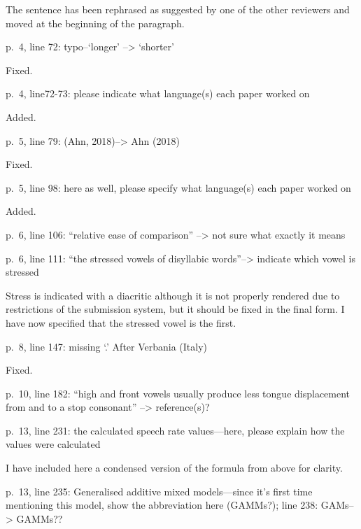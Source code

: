 \documentclass[]{article}
\begin{document}
\color{plum}

The sentence has been rephrased as suggested by one of the other
reviewers and moved at the beginning of the paragraph. \color{black}

p.~4, line 72: typo--`longer' --\textgreater{} `shorter'

\color{plum}

Fixed. \color{black}

p.~4, line72-73: please indicate what language(s) each paper worked on

\color{plum}

Added. \color{black}

p.~5, line 79: (Ahn, 2018)--\textgreater{} Ahn (2018)

\color{plum}

Fixed. \color{black}

p.~5, line 98: here as well, please specify what language(s) each paper
worked on

\color{plum}

Added. \color{black}

p.~6, line 106: ``relative ease of comparison'' --\textgreater{} not
sure what exactly it means

p.~6, line 111: ``the stressed vowels of disyllabic
words''--\textgreater{} indicate which vowel is stressed

\color{plum}

Stress is indicated with a diacritic although it is not properly
rendered due to restrictions of the submission system, but it should be
fixed in the final form. I have now specified that the stressed vowel is
the first. \color{black}

p.~8, line 147: missing `.' After Verbania (Italy)

\color{plum}

Fixed. \color{black}

p.~10, line 182: ``high and front vowels usually produce less tongue
displacement from and to a stop consonant'' --\textgreater{}
reference(s)?

p.~13, line 231: the calculated speech rate values---here, please
explain how the values were calculated

\color{plum}

I have included here a condensed version of the formula from above for
clarity. \color{black}

p.~13, line 235: Generalised additive mixed models---since it's first
time mentioning this model, show the abbreviation here (GAMMs?); line
238: GAMs--\textgreater{} GAMMs??
\end{document}
